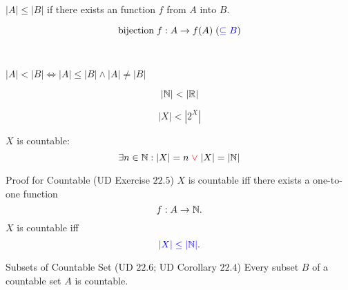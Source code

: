 \begin{frame}{}
\end{frame}

\begin{frame}{}
  \begin{definition}[$|A| \le |B|$]
    $|A| \le |B|$ if there exists an  function $f$ from $A$ into $B$.
  \end{definition}

  \[
    \text{bijection} \;f: A \to f(A) \; (\textcolor{blue}{\subseteq B})
  \]

  \pause
  \vspace{0.80cm}
  \begin{center}
    {} \\[8pt]
    {}
  \end{center}
\end{frame}

\begin{frame}{}
  \begin{definition}[$|A| < |B|$]
    $|A| < |B| \iff |A| \le |B| \land |A| \neq |B|$ 
  \end{definition}

  \pause
  \[
    |\mathbb{N}| < |\mathbb{R}|
  \]

  \[
    |X| < |2^{X}|
  \]
\end{frame}

\begin{frame}{}
  \begin{definition}
    $X$ is countable:
    \[
      \exists n \in \mathbb{N}: |X| = n \textcolor{red}{\;\lor\;} |X| = |\mathbb{N}|
    \]
  \end{definition}

  \begin{exampleblock}{Proof for Countable (UD Exercise $22.5$)}
    $X$ is countable iff there exists a one-to-one function
    \[
      f: A \to \mathbb{N}.
    \]
    \pause
    $X$ is countable iff
    \[
      \textcolor{blue}{|X| \le |\mathbb{N}|.}
    \]
  \end{exampleblock}

  \pause
  \begin{exampleblock}{Subsets of Countable Set (UD $22.6$; UD Corollary $22.4$)}
    Every subset $B$ of a countable set $A$ is countable.
  \end{exampleblock}
\end{frame}

